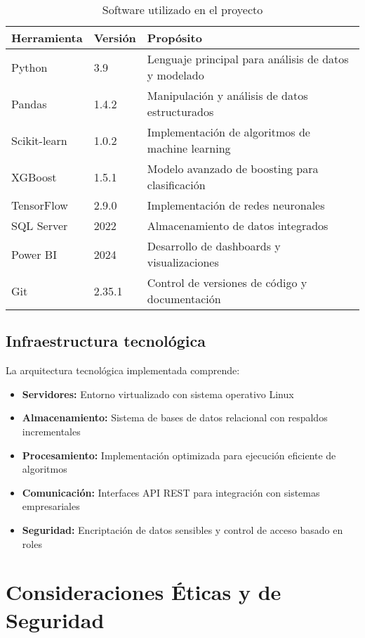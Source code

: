 \begin{table}[ht]
\centering
\begin{tabular}{|p{3cm}|p{3cm}|p{8cm}|}
\hline
\textbf{Herramienta} & \textbf{Versión} & \textbf{Propósito} \\
\hline
Python & 3.9 & Lenguaje principal para análisis de datos y modelado \\
\hline
Pandas & 1.4.2 & Manipulación y análisis de datos estructurados \\
\hline
Scikit-learn & 1.0.2 & Implementación de algoritmos de machine learning \\
\hline
XGBoost & 1.5.1 & Modelo avanzado de boosting para clasificación \\
\hline
TensorFlow & 2.9.0 & Implementación de redes neuronales \\
\hline
SQL Server & 2022 & Almacenamiento de datos integrados \\
\hline
Power BI & 2024 & Desarrollo de dashboards y visualizaciones \\
\hline
Git & 2.35.1 & Control de versiones de código y documentación \\
\hline
\end{tabular}
\caption{Software utilizado en el proyecto}
\end{table}

\subsection{Infraestructura tecnológica}
La arquitectura tecnológica implementada comprende:

\begin{itemize}
    \item \textbf{Servidores:} Entorno virtualizado con sistema operativo Linux
    \item \textbf{Almacenamiento:} Sistema de bases de datos relacional con respaldos incrementales
    \item \textbf{Procesamiento:} Implementación optimizada para ejecución eficiente de algoritmos
    \item \textbf{Comunicación:} Interfaces API REST para integración con sistemas empresariales
    \item \textbf{Seguridad:} Encriptación de datos sensibles y control de acceso basado en roles
\end{itemize}

\section{Consideraciones Éticas y de Seguridad}
